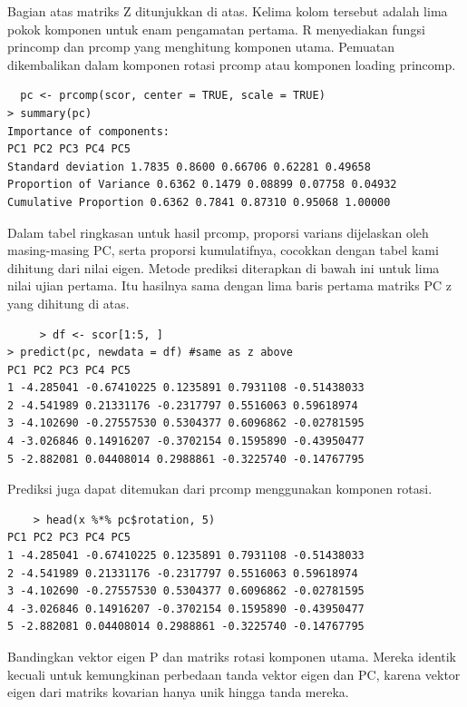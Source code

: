 \documentclass[a4paper,12pt]{article}
\theoremstyle{definition}
\begin{document}
 Bagian atas matriks Z ditunjukkan di atas. Kelima kolom tersebut adalah lima pokok komponen untuk enam pengamatan pertama. R menyediakan fungsi princomp dan prcomp yang menghitung komponen utama. Pemuatan dikembalikan dalam komponen rotasi prcomp atau komponen loading princomp.

 \begin{lstlisting}
  pc <- prcomp(scor, center = TRUE, scale = TRUE)
> summary(pc)
Importance of components:
PC1 PC2 PC3 PC4 PC5
Standard deviation 1.7835 0.8600 0.66706 0.62281 0.49658
Proportion of Variance 0.6362 0.1479 0.08899 0.07758 0.04932
Cumulative Proportion 0.6362 0.7841 0.87310 0.95068 1.00000   
 \end{lstlisting}

 Dalam tabel ringkasan untuk hasil prcomp, proporsi varians dijelaskan oleh masing-masing PC, serta proporsi kumulatifnya, cocokkan dengan tabel kami  dihitung dari nilai eigen. Metode prediksi diterapkan di bawah ini untuk lima nilai ujian pertama. Itu hasilnya sama dengan lima baris pertama matriks PC z yang dihitung di atas.

 \begin{lstlisting}
     > df <- scor[1:5, ]
> predict(pc, newdata = df) #same as z above
PC1 PC2 PC3 PC4 PC5
1 -4.285041 -0.67410225 0.1235891 0.7931108 -0.51438033
2 -4.541989 0.21331176 -0.2317797 0.5516063 0.59618974
3 -4.102690 -0.27557530 0.5304377 0.6096862 -0.02781595
4 -3.026846 0.14916207 -0.3702154 0.1595890 -0.43950477
5 -2.882081 0.04408014 0.2988861 -0.3225740 -0.14767795

 \end{lstlisting}

 
Prediksi juga dapat ditemukan dari prcomp menggunakan komponen rotasi.

\begin{lstlisting}
    > head(x %*% pc$rotation, 5)
PC1 PC2 PC3 PC4 PC5
1 -4.285041 -0.67410225 0.1235891 0.7931108 -0.51438033
2 -4.541989 0.21331176 -0.2317797 0.5516063 0.59618974
3 -4.102690 -0.27557530 0.5304377 0.6096862 -0.02781595
4 -3.026846 0.14916207 -0.3702154 0.1595890 -0.43950477
5 -2.882081 0.04408014 0.2988861 -0.3225740 -0.14767795

\end{lstlisting}

Bandingkan vektor eigen P dan matriks rotasi komponen utama. Mereka identik kecuali untuk kemungkinan perbedaan tanda vektor eigen dan PC, karena vektor eigen dari matriks kovarian hanya unik hingga tanda mereka.
\end{document}
